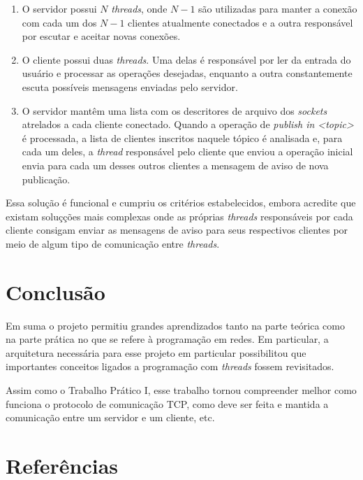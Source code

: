 \documentclass{article}
\begin{document}
\begin{enumerate}
      \item O servidor possui \(N\) \textit{threads}, onde \(N - 1\) são
            utilizadas para manter a conexão com cada um dos \(N - 1\) clientes
            atualmente
            conectados e a outra responsável por escutar e aceitar novas
            conexões.
      \item O cliente possui duas \textit{threads}. Uma delas é responsável por
            ler da entrada do usuário e processar as operações desejadas,
            enquanto a outra
            constantemente escuta possíveis mensagens enviadas pelo servidor.
      \item O servidor mantêm uma lista com os descritores de arquivo dos
            \textit{sockets} atrelados a cada cliente conectado. Quando a
            operação de \textit{publish in <topic>} é processada, a lista de
            clientes
            inscritos naquele tópico é analisada e, para cada um deles, a
            \textit{thread} responsável pelo cliente que enviou a operação
            inicial envia
            para cada um desses outros clientes a mensagem de aviso de nova
            publicação.
\end{enumerate}

Essa solução é funcional e cumpriu os critérios estabelecidos, embora acredite
que existam soluçções mais complexas onde as próprias \textit{threads}
responsáveis por cada cliente consigam enviar as mensagens de aviso para seus
respectivos clientes por meio de algum tipo de comunicação entre
\textit{threads}.

\section{Conclusão}

Em suma o projeto permitiu grandes aprendizados tanto na parte teórica como na
parte prática no que se refere à programação em redes. Em particular, a
arquitetura necessária para esse projeto em particular possibilitou que
importantes conceitos ligados a programação com \textit{threads} fossem
revisitados.

Assim como o Trabalho Prático I, esse trabalho tornou compreender melhor como
funciona o protocolo de comunicação TCP, como
deve ser feita e mantida a comunicação entre um servidor e um cliente, etc.

\section{Referências}
\end{document}
